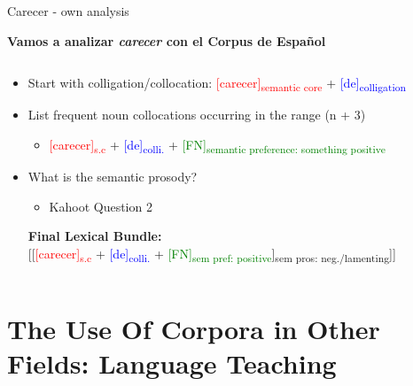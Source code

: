 \documentclass{beamer}
\begin{document}
\begin{frame}{Carecer - own analysis}
	\begin{center}
    \textbf{Vamos a analizar \textit{carecer} con el Corpus de Español}
    \end{center}
    \begin{columns}
    	\begin{column}{15cm}
            \begin{itemize} 
            \pause
            \item Start with colligation/collocation: \textcolor{red}{{[carecer]}\textsubscript{semantic core}} + \textcolor{blue}{{[de]}\textsubscript{colligation}}
           \pause
           \item List frequent noun collocations occurring in the range (n + 3)
            	\begin{itemize}
                    \pause
                    \item \textcolor{red}{{[carecer]}\textsubscript{s.c}} + \textcolor{blue}{{[de]}\textsubscript{colli.}} + \textcolor{green}{{[}FN{]}\textsubscript{semantic preference: something positive}}
            	\end{itemize}
            \pause
            \item What is the semantic prosody?
            	\begin{itemize}
                	\item Kahoot Question 2
                \end{itemize}
                \vspace{2em}
                \pause
                \textbf{Final Lexical Bundle:}\\
                {[}{[}\textcolor{red}{{[carecer]}\textsubscript{s.c}} + \textcolor{blue}{{[de]}\textsubscript{colli.}} + \textcolor{green}{{[}FN{]}\textsubscript{sem pref: positive}}{]}\textsubscript{sem pros: neg./lamenting}{]}{]}
         \end{itemize}
        \end{column}   
    \end{columns}
\end{frame}



\section{The Use Of Corpora in Other Fields: Language Teaching}
\end{document}

